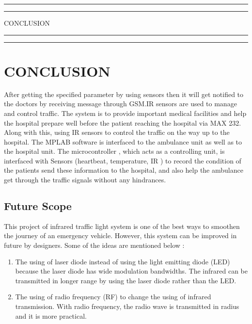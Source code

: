 \documentclass[12pt,a4paper,oneside,openright]{report}
\begin{document}
\newpage
\vspace*{\fill}
 \begin{center}
\hrule%
\vspace{1pt}%
\hrule
\vspace{1pc}%
\LARGE\MakeUppercase{CONCLUSION} 
\vspace{1pc}%
\hrule%
\vspace{1pt}%
\hrule
 \end{center}
 \vspace*{\fill}

\chapter{CONCLUSION}
After getting the specified parameter by using sensors then it will get notified to the doctors by receiving message through GSM.IR sensors are used to manage and control traffic. The system is to provide important medical facilities and help the hospital prepare well before the patient reaching the hospital via MAX 232. Along with this, using IR sensors to control the traffic on the way up to the hospital. The MPLAB software is interfaced to the ambulance unit as well as to the hospital unit. The microcontroller , which acts as a controlling unit, is interfaced with Sensors (heartbeat, temperature, IR ) to record the condition of the patients send these information to the hospital, and also help the ambulance get through the traffic signals without any hindrances.
\section{Future Scope}
This project of infrared traffic light system is one of the best ways to smoothen the journey of an emergency vehicle. However, this system can be improved in future by designers. Some of the ideas are mentioned below :
\begin{enumerate}
 \item The using of laser diode instead of using the light emitting diode (LED) because the laser   diode has wide modulation bandwidths. The infrared can be transmitted in longer range by using the laser diode rather than the LED. 
\item The using of radio frequency (RF) to change the using of infrared transmission. With radio frequency, the radio wave is transmitted in radius and it is more practical.
\end{enumerate}
\end{document}
